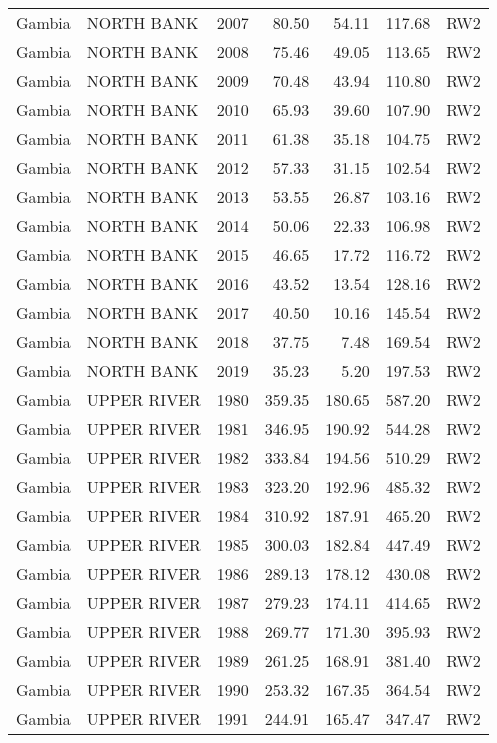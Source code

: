 \begin{longtable}{lllrrrl}
  Gambia & NORTH BANK & 2007 & 80.50 & 54.11 & 117.68 & RW2 \\ 
  Gambia & NORTH BANK & 2008 & 75.46 & 49.05 & 113.65 & RW2 \\ 
  Gambia & NORTH BANK & 2009 & 70.48 & 43.94 & 110.80 & RW2 \\ 
  Gambia & NORTH BANK & 2010 & 65.93 & 39.60 & 107.90 & RW2 \\ 
  Gambia & NORTH BANK & 2011 & 61.38 & 35.18 & 104.75 & RW2 \\ 
  Gambia & NORTH BANK & 2012 & 57.33 & 31.15 & 102.54 & RW2 \\ 
  Gambia & NORTH BANK & 2013 & 53.55 & 26.87 & 103.16 & RW2 \\ 
  Gambia & NORTH BANK & 2014 & 50.06 & 22.33 & 106.98 & RW2 \\ 
  Gambia & NORTH BANK & 2015 & 46.65 & 17.72 & 116.72 & RW2 \\ 
  Gambia & NORTH BANK & 2016 & 43.52 & 13.54 & 128.16 & RW2 \\ 
  Gambia & NORTH BANK & 2017 & 40.50 & 10.16 & 145.54 & RW2 \\ 
  Gambia & NORTH BANK & 2018 & 37.75 & 7.48 & 169.54 & RW2 \\ 
  Gambia & NORTH BANK & 2019 & 35.23 & 5.20 & 197.53 & RW2 \\ 
  Gambia & UPPER RIVER & 1980 & 359.35 & 180.65 & 587.20 & RW2 \\ 
  Gambia & UPPER RIVER & 1981 & 346.95 & 190.92 & 544.28 & RW2 \\ 
  Gambia & UPPER RIVER & 1982 & 333.84 & 194.56 & 510.29 & RW2 \\ 
  Gambia & UPPER RIVER & 1983 & 323.20 & 192.96 & 485.32 & RW2 \\ 
  Gambia & UPPER RIVER & 1984 & 310.92 & 187.91 & 465.20 & RW2 \\ 
  Gambia & UPPER RIVER & 1985 & 300.03 & 182.84 & 447.49 & RW2 \\ 
  Gambia & UPPER RIVER & 1986 & 289.13 & 178.12 & 430.08 & RW2 \\ 
  Gambia & UPPER RIVER & 1987 & 279.23 & 174.11 & 414.65 & RW2 \\ 
  Gambia & UPPER RIVER & 1988 & 269.77 & 171.30 & 395.93 & RW2 \\ 
  Gambia & UPPER RIVER & 1989 & 261.25 & 168.91 & 381.40 & RW2 \\ 
  Gambia & UPPER RIVER & 1990 & 253.32 & 167.35 & 364.54 & RW2 \\ 
  Gambia & UPPER RIVER & 1991 & 244.91 & 165.47 & 347.47 & RW2 \\ 

\end{longtable}
